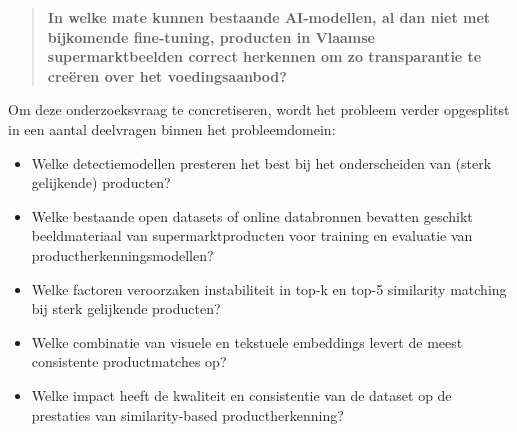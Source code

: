 \documentclass[dutch,dit,thesis]{hogentreport}
\begin{document}
\begin{quote}
\textbf{In welke mate kunnen bestaande AI-modellen, al dan niet met bijkomende fine-tuning, producten in Vlaamse supermarktbeelden correct herkennen om zo transparantie te creëren over het voedingsaanbod?}
\end{quote}

Om deze onderzoeksvraag te concretiseren, wordt het probleem verder opgesplitst in een aantal deelvragen binnen het probleemdomein:
\begin{itemize}
    \item Welke detectiemodellen presteren het best bij het onderscheiden van (sterk gelijkende) producten?
    \item Welke bestaande open datasets of online databronnen bevatten geschikt beeldmateriaal van supermarktproducten voor training en evaluatie van productherkenningsmodellen?
    \item Welke factoren veroorzaken instabiliteit in top-k en top-5 similarity matching bij sterk gelijkende producten?
    \item Welke combinatie van visuele en tekstuele embeddings levert de meest consistente productmatches op?
    \item Welke impact heeft de kwaliteit en consistentie van de dataset op de prestaties van similarity-based productherkenning?
\end{itemize}
\end{document}
